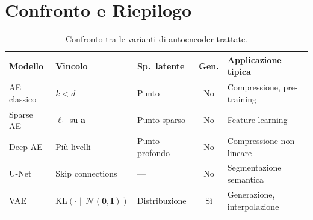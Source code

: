\section{Confronto e Riepilogo}
\label{sec:ae-summary}

\begin{table}[H]
  \centering
  \caption{Confronto tra le varianti di autoencoder trattate.}
  \label{tab:ae-comparison}
  \small
  \begin{tabularx}{\linewidth}{l X l c X}
    \toprule
    \textbf{Modello} & \textbf{Vincolo} & \textbf{Sp.\ latente}
      & \textbf{Gen.} & \textbf{Applicazione tipica} \\
    \midrule
    AE classico & $k < d$                                             & Punto          & No & Compressione, pre-training \\
    Sparse AE   & $\ell_1$ su $\mathbf{a}$                            & Punto sparso   & No & Feature learning \\
    Deep AE     & Più livelli                                         & Punto profondo & No & Compressione non lineare \\
    U-Net       & Skip connections                                    & ---            & No & Segmentazione semantica \\
    VAE         & $\mathrm{KL}(\cdot\|\mathcal{N}(\mathbf{0},\mathbf{I}))$ & Distribuzione  & Sì & Generazione, interpolazione \\
    \bottomrule
  \end{tabularx}
\end{table}


